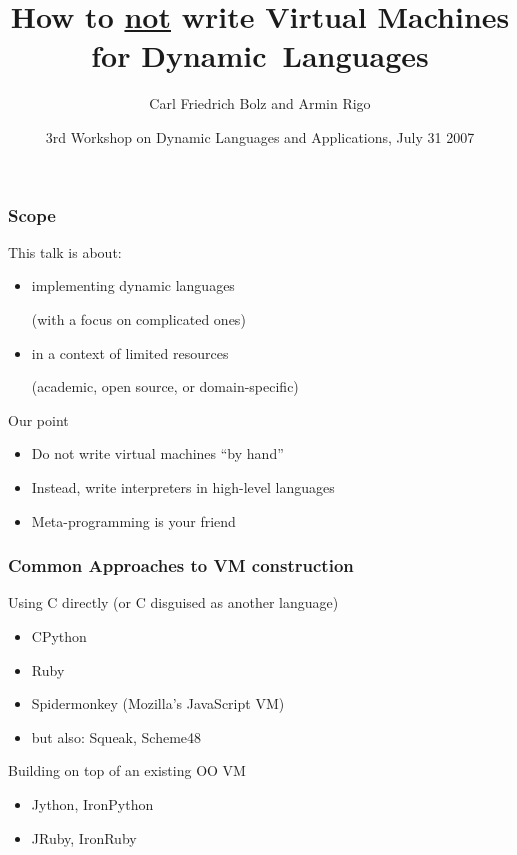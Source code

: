 \documentclass[utf8x]{beamer}
\title{How to \underline{not} write Virtual Machines for \mbox{Dynamic Languages}}
\author{Carl Friedrich Bolz and Armin Rigo}
\institute[Heinrich-Heine-Universität Düsseldorf]
{
  Institut für Informatik\\
  Heinrich-Heine-Universität Düsseldorf
}
\date{3rd Workshop on Dynamic Languages and Applications, July 31 2007}
\begin{document}
\begin{frame}
  \titlepage
\end{frame}


\begin{frame}
  \frametitle{Scope}
  This talk is about:

  \begin{itemize}
  \item
    implementing dynamic languages \par(with a focus on complicated ones)
  \item
    in a context of limited resources \par(academic, open source, or
    domain-specific)
  \end{itemize}
  \pause
  \begin{block}{
    Our point}
    \begin{itemize}
    \item
      Do not write virtual machines ``by hand''
    \item
      Instead, write interpreters in high-level languages
    \item
      Meta-programming is your friend
    \end{itemize}
  \end{block}
\end{frame}


\begin{frame}
  \frametitle{Common Approaches to VM construction}
  \begin{block}{
    Using C directly (or C disguised as another language)}
    \begin{itemize}
    \item
      CPython
    \item
      Ruby
    \item
      Spidermonkey (Mozilla's JavaScript VM)
    \item
      but also: Squeak, Scheme48
    \end{itemize}
  \end{block}
  \begin{block}{
    Building on top of an existing OO VM}
    \begin{itemize}
    \item
      Jython, IronPython
    \item
      JRuby, IronRuby
    \end{itemize}
  \end{block}
\end{frame}
\end{document}
